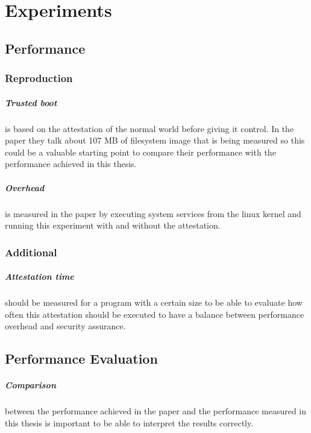 \documentclass{report}
\begin{document}
\chapter{Experiments}

\section{Performance}

\subsection*{Reproduction}

\paragraph*{Trusted boot}
is based on the attestation of the normal world before giving it control. In the paper they talk about 107 MB of filesystem image that is being measured so this could be a valuable starting point to compare their performance with the performance achieved in this thesis.

\paragraph*{Overhead}
is measured in the paper by executing system services from the linux kernel and running this experiment with and without the attestation.

\subsection*{Additional}

\paragraph*{Attestation time}
should be measured for a program with a certain size to be able to evaluate how often this attestation should be executed to have a balance between performance overhead and security assurance.

\section{Performance Evaluation}

\paragraph*{Comparison}
between the performance achieved in the paper and the performance measured in this thesis is important to be able to interpret the results correctly.
\end{document}
